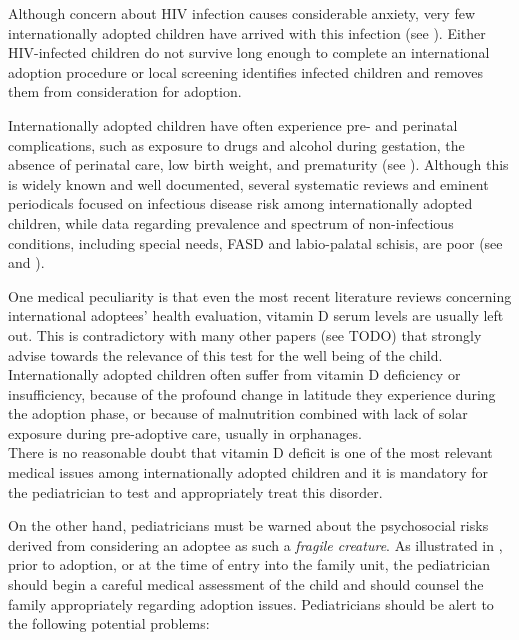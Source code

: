 Although concern about HIV infection causes considerable anxiety, very few internationally adopted children have arrived with this infection (see \cite{caringfor}). Either HIV-infected children do not survive long enough to complete an international adoption procedure or local screening identifies infected children and removes them from consideration for adoption.

Internationally adopted children have often experience pre- and perinatal complications, such as exposure to drugs and alcohol during gestation, the absence of perinatal care, low birth weight, and prematurity (see \cite{preventing}). Although this is widely known and well documented, several systematic reviews and eminent periodicals focused on infectious disease risk among internationally adopted children, while data regarding prevalence and spectrum of non-infectious conditions, including special needs, FASD and labio-palatal schisis, are poor (see \cite{notonlyinfectious} and \cite{nonsoloinfezioni}).

One medical peculiarity is that even the most recent literature reviews concerning international adoptees' health evaluation, vitamin D serum levels are usually left out. This is contradictory with many other papers (see TODO) that strongly advise towards the relevance of this test for the well being of the child. Internationally adopted children often suffer from vitamin D deficiency or insufficiency, because of the profound change in latitude they experience during the adoption phase, or because of malnutrition combined with lack of solar exposure during pre-adoptive care, usually in orphanages.\\
There is no reasonable doubt that vitamin D deficit is one of the most relevant medical issues among internationally adopted children and it is mandatory for the pediatrician to test and appropriately treat this disorder.

On the other hand, pediatricians must be warned about the psychosocial risks derived from considering an adoptee as such a \textit{fragile creature}. As illustrated in \cite{initialeval}, prior to adoption, or at the time of entry into the family unit, the pediatrician should begin a careful medical assessment of the child and should counsel the family appropriately regarding adoption issues. Pediatricians should be alert to the following potential problems:

